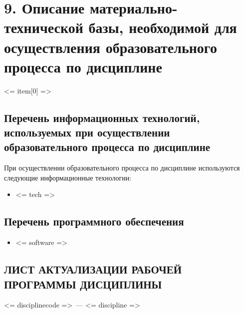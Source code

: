 \documentclass[a4paper,12pt]{article}
\begin{document}
\newpage
\section{9. Описание материально-технической базы, необходимой для осуществления образовательного процесса по дисциплине}
  \par <= item[0] => 



\subsection{Перечень информационных технологий, используемых при осуществлении образовательного процесса по дисциплине}
При осуществлении образовательного процесса по дисциплине используются следующие информационные технологии:
\begin{itemize}[nolistsep]
\item <= tech =>
\end{itemize}

\subsection{Перечень программного обеспечения}
\begin{itemize}[nolistsep]
\item <= software =>
\end{itemize}



\newpage
\begin{center}
\section*{ЛИСТ АКТУАЛИЗАЦИИ РАБОЧЕЙ ПРОГРАММЫ ДИСЦИПЛИНЫ}
<= disciplinecode =>\ --- <= discipline => 
\end{center}
\end{document}
